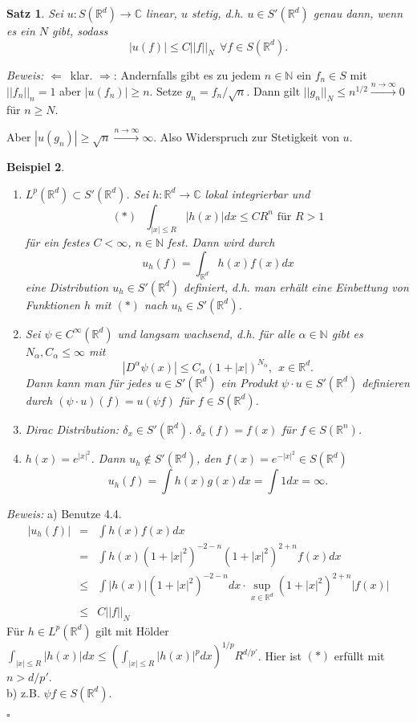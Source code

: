 \documentclass[11pt,a4paper,titlepage, ngerman]{scrartcl}
\newtheorem{Satz}{Satz}[section]
\newtheorem{Beispiel}[Satz]{Beispiel}
\numberwithin{equation}{section}
\newcommand{\C}{\mathbb{C}} %
\newcommand{\R}{\mathbb{R}} %
\newcommand{\N}{\mathbb{N}} %
\newcommand{\m}{\cdot}
\newcommand{\Bew}{\emph{Beweis: }}
\newcommand{\qed}{\begin{flushright}
		$\square$
	\end{flushright}}
\begin{document}
	\begin{Satz}
		Sei $u:S(\R^d)\rightarrow \C$ linear, $u$ stetig, d.h. $u\in S'(\R^d)$ genau dann, wenn es ein $N$ gibt, sodass 
		$$|u(f)|\leq C||f||_N~~\forall f\in S(\R^d).$$
	\end{Satz}
	
	\Bew \glqq$\Leftarrow$\grqq\ klar. \glqq$\Rightarrow$\grqq: Andernfalls gibt es zu jedem $n\in \N$ ein $f_n\in S$ mit $||f_n||_n = 1$ aber $|u(f_n)|\geq n$. Setze $g_n = f_n/\sqrt{n}$. Dann gilt $||g_n||_N \leq n^{1/2}\overset{n\rightarrow\infty}{\rightarrow} 0$ für $n\geq N$.
	
	Aber $|u(g_n)|\geq \sqrt{n}\overset{n\rightarrow\infty}{\rightarrow}\infty$. Also Widerspruch zur Stetigkeit von $u$.
	
	
	\begin{Beispiel}
		~
		\begin{enumerate}
			\item[a)] \glqq$L^p(\R^d)\subset S'(\R^d)$\grqq. Sei $h:\R^d\rightarrow \C$ lokal integrierbar und
			$$(*)~~~\int_{|x|\leq R}|h(x)|dx\leq C R^n\text{ für } R> 1$$
			für ein festes $C<\infty$, $n\in \N$ fest. Dann wird durch 
			$$u_h(f)= \int_{\R^d} h(x)f(x)dx$$
			eine Distribution $u_h\in S'(\R^d)$ definiert, d.h. man erhält eine Einbettung von Funktionen $h$ mit $(*)$ nach $u_h\in S'(\R^d)$.
			\item[b)] Sei $\psi\in C^\infty(\R^d)$ und langsam wachsend, d.h. für alle $\alpha\in \N$ gibt es $N_\alpha, C_\alpha\leq \infty$ mit 
			$$|D^\alpha\psi(x)|\leq C_\alpha(1+|x|)^{N_\alpha},~~ x\in \R^d.$$
			Dann kann man für jedes $u\in S'(\R^d)$ ein Produkt $\psi\m u\in S'(\R^d)$ definieren durch $(\psi\m u)(f) = u(\psi f)$ für $f\in S(\R^d)$.
			\item[c)] Dirac Distribution: $\delta_x\in S'(\R^d)$. $\delta_x(f) = f(x)$ für $f\in S(\R^n)$.
			\item[d)] $h(x) = e^{|x|^2}$. Dann $u_h\notin S'(\R^d)$, den $f(x) = e^{-|x|^2}\in S(\R^d)$
			$$u_h(f)=\int h(x) g(x) dx = \int 1 dx = \infty.$$
		\end{enumerate}
	\end{Beispiel}
	\Bew a) Benutze 4.4. 
	\begin{eqnarray}
		|u_h(f)| &=& \int h(x)f(x)dx\nonumber\\
		&=& \int h(x)(1+|x|^2)^{-2-n}(1+|x|^2)^{2+n}f(x) dx \nonumber\\
		&\leq& \int |h(x)|(1+|x|^2)^{-2-n}dx\m \sup_{x\in \R^d}(1+|x|^2)^{2+n}|f(x)|\nonumber\\
		&\leq& C||f||_N\nonumber
	\end{eqnarray}
	Für $h\in L^p(\R^d)$ gilt mit Hölder $\int_{|x|\leq R}|h(x)|dx\leq \left(\int_{|x|\leq R}|h(x)|^p dx \right)^{1/p} R^{d/p'}$. Hier ist $(*)$ erfüllt mit $n>d/p'$.\\
	b) z.B. $\psi f\in S(\R^d)$.
	\qed
	
\end{document}
